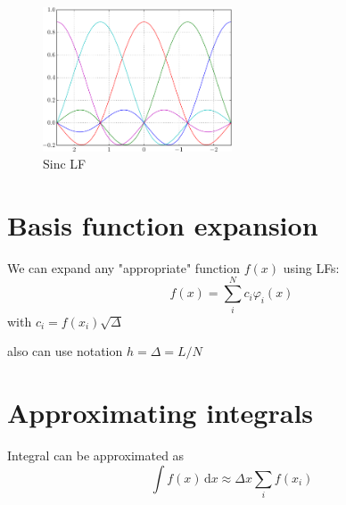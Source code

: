 \begin{figure}[h]
{\centering
\includegraphics[width=0.5\textwidth]{../../tests/plot_1d/LF1d_sinc.pdf}
\par}
\caption{Sinc LF}\label{fig:LF1d_sinc_5}
\end{figure}


\section{Basis function expansion}

We can expand any "appropriate" function $f(x)$ using LFs:
\begin{equation}
f(x) = \sum_{i}^{N} c_{i} \varphi_{i}(x)
\end{equation}
with $c_{i} = f(x_{i}) \sqrt{\Delta}$

also can use notation $h = \Delta = L/N$

\section{Approximating integrals}
Integral can be approximated as
\begin{equation}
\int f(x)\,\mathrm{d}x \approx \Delta x \sum_{i} f(x_{i})
\end{equation}
